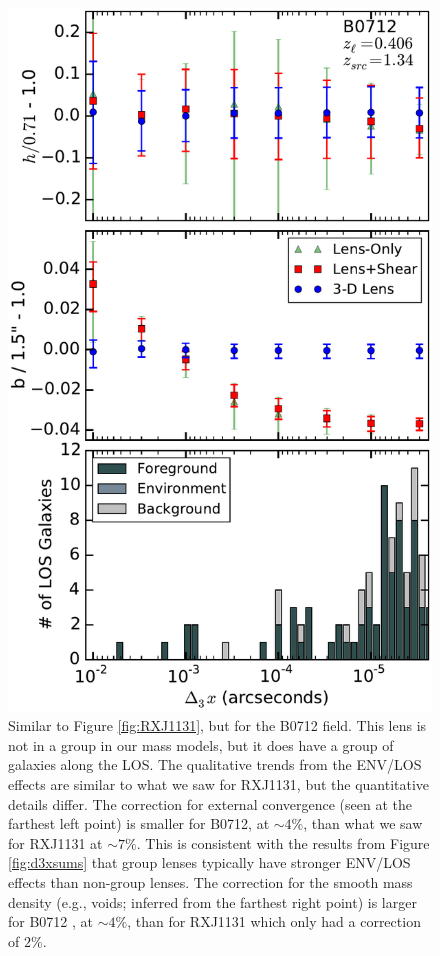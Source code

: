\documentclass{emulateapj}
\begin{document}
\begin{figure}[t]
\begin{center}
\includegraphics[width=\columnwidth]{new_B0712_reallos.pdf}
\caption{\label{fig:B0712} Similar to Figure \ref{fig:RXJ1131}, but for the B0712 field.  This lens is not in a group in our mass models, but it does have a group of galaxies along the LOS.  The qualitative trends from the ENV/LOS effects are similar to what we saw for RXJ1131, but the quantitative details differ. The correction for external convergence (seen at the farthest left point) is smaller for B0712, at $\sim 4\%$, than what we saw for RXJ1131 at $\sim 7\%$. This is consistent with the results from Figure \ref{fig:d3xsums} that group lenses typically have stronger ENV/LOS effects than non-group lenses. The correction for the smooth mass density (e.g., voids; inferred from the farthest right point) is larger for B0712 , at $\sim 4\%$, than for RXJ1131 which only had a correction of $2 \%$.
}
\end{center}
\end{figure}
\end{document}

